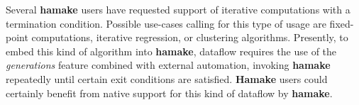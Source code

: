 \documentclass[10pt,conference,letterpaper]{IEEEtran}
\begin{document}
Several \textbf{hamake} users have requested support of iterative computations
with a termination condition. Possible use-cases calling for this type
of usage are fixed-point computations, iterative regression, or
clustering algorithms. Presently, to embed this kind of algorithm
into \textbf{hamake}, dataflow requires the use of the \textit{generations} feature
combined with external automation, invoking \textbf{hamake} repeatedly until
certain exit conditions are satisfied. \textbf{Hamake} users could
certainly benefit from native support for this kind of dataflow by
\textbf{hamake}.



\end{document}
